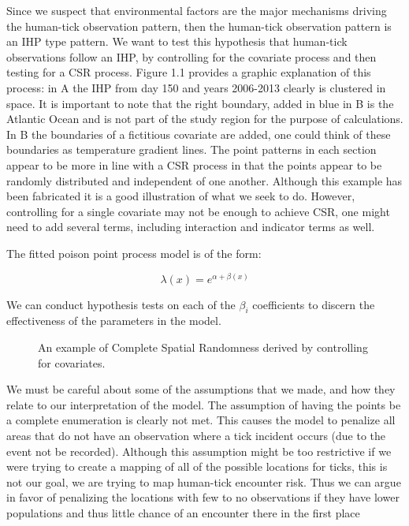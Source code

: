 \noindent Since we suspect that environmental factors are the major mechanisms driving the human-tick observation pattern, then the human-tick observation pattern is an IHP type pattern. We want to test this hypothesis  that human-tick observations follow an IHP, by controlling for the covariate process and then testing for a CSR process. Figure 1.1 provides a graphic explanation of this process: in A the IHP from day 150 and years 2006-2013 clearly is clustered in space. It is important to note that the right boundary, added in blue in B is the Atlantic Ocean and is not part of the study region for the purpose of calculations. In B the boundaries of a fictitious covariate are added, one could think of these boundaries as temperature gradient lines. The point patterns in each section appear to be more in line with a CSR process in that the points appear to be randomly distributed and independent of one another. Although this example has been fabricated it is a good illustration of what we seek to do. However, controlling for a single covariate may not be enough to achieve CSR, one might need to add several terms, including interaction and indicator terms as well.\newline
 
 
\noindent The fitted poison point process model is of the form:

\begin{equation}
\lambda(x) = e^{\alpha +\beta(x)}
\end{equation}

\noindent We can conduct hypothesis tests on each of the $\beta_i$ coefficients to discern the effectiveness of the parameters in the model. \newline


\begin{figure} [t]
\centerline{}
\caption{An example of Complete Spatial Randomness derived by controlling for covariates. }
\label{fig6}
\end{figure}

\noindent We must be careful about some of the assumptions that we made, and how they relate to our interpretation of the model. The assumption of having the points be a complete enumeration is clearly not met. This causes the model to penalize all areas that do not have an observation where a tick incident occurs (due to the event not be recorded). Although this assumption might be too restrictive if we were trying to create a mapping of all of the possible locations for ticks, this is not our goal, we are trying to map human-tick encounter risk. Thus we can argue in favor of penalizing the locations with few to no observations if they have lower populations and thus little chance of an encounter there in the first place\newline


